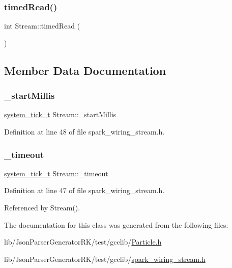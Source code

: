 \mbox{\label{class_stream_a416a0ada5ed3c9d27f1e72c7d73f0aa1}} 
\subsubsection{\texorpdfstring{timed\+Read()}{timedRead()}}
{\footnotesize\ttfamily int Stream\+::timed\+Read (\begin{DoxyParamCaption}{ }\end{DoxyParamCaption})\hspace{0.3cm}{\ttfamily [protected]}}



\subsection{Member Data Documentation}
\mbox{\label{class_stream_abbead2dae5b725a965860b65fb7f6b34}} 
\subsubsection{\texorpdfstring{\+\_\+start\+Millis}{\_startMillis}}
{\footnotesize\ttfamily \hyperlink{system__tick__hal_8h_a272b267acff35fc07ab6b6011843dd6c}{system\+\_\+tick\+\_\+t} Stream\+::\+\_\+start\+Millis\hspace{0.3cm}{\ttfamily [protected]}}



Definition at line 48 of file spark\+\_\+wiring\+\_\+stream.\+h.

\mbox{\label{class_stream_ae1fc2b43124fc405406ce18b7e22d48c}} 
\subsubsection{\texorpdfstring{\+\_\+timeout}{\_timeout}}
{\footnotesize\ttfamily \hyperlink{system__tick__hal_8h_a272b267acff35fc07ab6b6011843dd6c}{system\+\_\+tick\+\_\+t} Stream\+::\+\_\+timeout\hspace{0.3cm}{\ttfamily [protected]}}



Definition at line 47 of file spark\+\_\+wiring\+\_\+stream.\+h.



Referenced by Stream().



The documentation for this class was generated from the following files\+:\begin{DoxyCompactItemize}
\item 
lib/\+Json\+Parser\+Generator\+R\+K/test/gcclib/\hyperlink{_particle_8h}{Particle.\+h}\item 
lib/\+Json\+Parser\+Generator\+R\+K/test/gcclib/\hyperlink{spark__wiring__stream_8h}{spark\+\_\+wiring\+\_\+stream.\+h}\end{DoxyCompactItemize}
